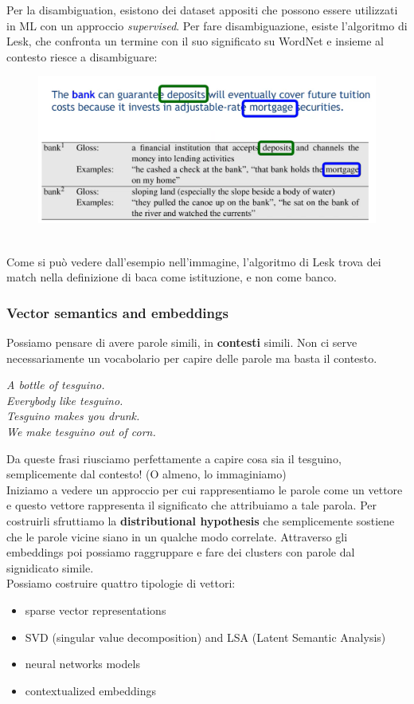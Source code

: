 Per la disambiguation, esistono dei dataset appositi che possono essere utilizzati in ML con un approccio \textit{supervised}. Per fare disambiguazione, esiste l'algoritmo di Lesk, che confronta un termine con il suo significato su WordNet e insieme al contesto riesce a disambiguare:
\\
\begin{figure}[th]
    \centering
    \includegraphics[scale=0.4]{Text Analysis/img/Lesk.png}
\end{figure}
\\
Come si può vedere dall'esempio nell'immagine, l'algoritmo di Lesk trova dei match nella definizione di baca come istituzione, e non come banco. 

\subsubsection{Vector semantics and embeddings}
Possiamo pensare di avere parole simili, in \textbf{contesti} simili. Non ci serve necessariamente un vocabolario per capire delle parole ma basta il contesto. 
\begin{center}
    \textit{A bottle of tesguino.}
    \\
    \textit{Everybody like tesguino.}
    \\
    \textit{Tesguino makes you drunk.}
    \\
    \textit{We make tesguino out of corn.}
\end{center}
Da queste frasi riusciamo perfettamente a capire cosa sia il tesguino, semplicemente dal contesto! (O almeno, lo immaginiamo)
\\
Iniziamo a vedere un approccio per cui rappresentiamo le parole come un vettore e questo vettore rappresenta il significato che attribuiamo a tale parola. Per costruirli sfruttiamo la \textbf{distributional hypothesis} che semplicemente sostiene che le parole vicine siano in un qualche modo correlate. Attraverso gli embeddings poi possiamo raggruppare e fare dei clusters con parole dal signidicato simile. 
\\
Possiamo costruire quattro tipologie di vettori:
\begin{itemize}
    \item sparse vector representations
    \item SVD (singular value decomposition) and LSA (Latent Semantic Analysis)
    \item neural networks models
    \item contextualized embeddings
\end{itemize}

